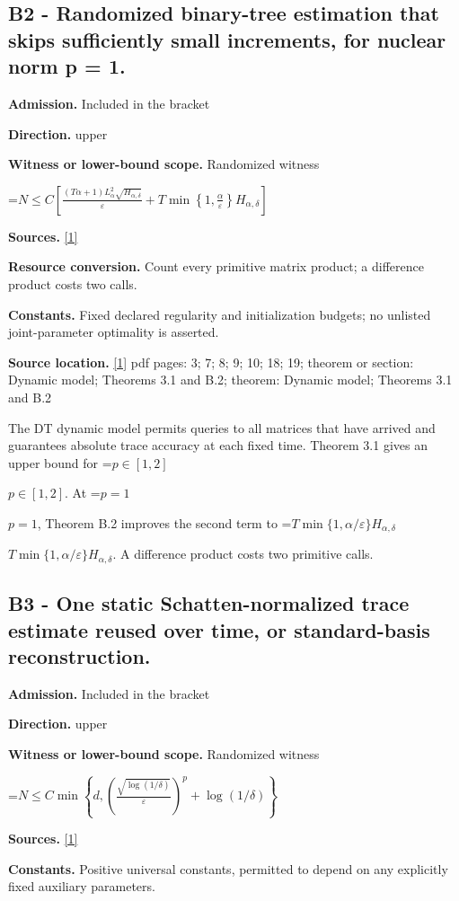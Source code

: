 \documentclass[10pt,a4paper]{article}
\newcommand{\AtlasMath}[1]{\par\begingroup\centering\setbox0=\hbox{$\displaystyle #1$}\ifdim\wd0>1.4\linewidth\typeout{ATLAS WIDE FORMULA: \the\wd0}\fi\ifdim\wd0>\linewidth\resizebox{\linewidth}{!}{\box0}\else\box0\fi\par\endgroup}
\newcommand{\AtlasInlineMath}[1]{\begingroup\setbox0=\hbox{$#1$}\ifdim\wd0>.4\linewidth\endgroup\AtlasMath{#1}\else\endgroup$#1$\fi}
\begin{document}
\subsection{B2 - Randomized binary-tree estimation that skips sufficiently small increments, for nuclear norm p = 1.}
\textbf{Admission.} Included in the bracket

\textbf{Direction.} upper

\textbf{Witness or lower-bound scope.} Randomized witness

\AtlasMath{N\le C\left[\frac{(T\alpha+1)L_\alpha^2\sqrt{H_{\alpha,\delta}}}{\varepsilon}+T\min\left\{1,\frac{\alpha}{\varepsilon}\right\}H_{\alpha,\delta}\right]}
\textbf{Sources.} \href{https://arxiv.org/pdf/2209.15219v1}{[1]}

\textbf{Resource conversion.} Count every primitive matrix product; a difference product costs two calls.

\textbf{Constants.} Fixed declared regularity and initialization budgets; no unlisted joint-parameter optimality is asserted.

\textbf{Source location.} \href{https://arxiv.org/pdf/2209.15219v1}{[1]} pdf pages: 3; 7; 8; 9; 10; 18; 19; theorem or section: Dynamic model; Theorems 3.1 and B.2; theorem: Dynamic model; Theorems 3.1 and B.2

The DT dynamic model permits queries to all matrices that have arrived and guarantees absolute trace accuracy at each fixed time. Theorem 3.1 gives an upper bound for \AtlasInlineMath{p\in[1,2]}. At \AtlasInlineMath{p=1}, Theorem B.2 improves the second term to \AtlasInlineMath{T\min\{1,\alpha/\varepsilon\}H_{\alpha,\delta}}. A difference product costs two primitive calls.

\subsection{B3 - One static Schatten-normalized trace estimate reused over time, or standard-basis reconstruction.}
\textbf{Admission.} Included in the bracket

\textbf{Direction.} upper

\textbf{Witness or lower-bound scope.} Randomized witness

\AtlasMath{N\le C\min\left\{d,\left(\frac{\sqrt{\log(1/\delta)}}{\varepsilon}\right)^p+\log(1/\delta)\right\}}
\textbf{Sources.} \href{https://arxiv.org/pdf/2209.15219v1}{[1]}

\textbf{Constants.} Positive universal constants, permitted to depend on any explicitly fixed auxiliary parameters.
\end{document}
